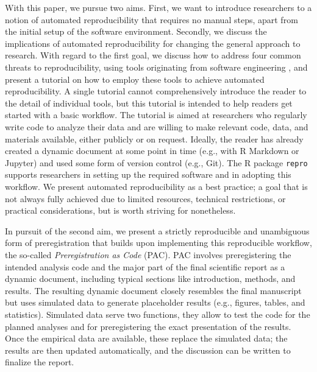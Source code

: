 \documentclass[psych,tutorial,submit,moreauthors,pdftex]{mdpi}
\begin{document}
With this paper, we pursue two aims. First, we want to introduce
researchers to a notion of automated reproducibility that requires no
manual steps, apart from the initial setup of the software environment.
Secondly, we discuss the implications of automated reproducibility for
changing the general approach to research. With regard to the first
goal, we discuss how to address four common threats to reproducibility,
using tools originating from software engineering \citep[see][ for
details]{Peikert2019}, and present a tutorial on how to employ these
tools to achieve automated reproducibility. A single tutorial cannot
comprehensively introduce the reader to the detail of individual tools,
but this tutorial is intended to help readers get started with a basic
workflow. The tutorial is aimed at researchers who regularly write code
to analyze their data and are willing to make relevant code, data, and
materials available, either publicly or on request. Ideally, the reader
has already created a dynamic document at some point in time (e.g., with
R Markdown or Jupyter) and used some form of version control (e.g.,
Git). The R package \texttt{repro} supports researchers in setting up
the required software and in adopting this workflow. We present
automated reproducibility as a best practice; a goal that is not always
fully achieved due to limited resources, technical restrictions, or
practical considerations, but is worth striving for nonetheless.

In pursuit of the second aim, we present a strictly reproducible and
unambiguous form of preregistration \citep{NosekRevolution2018} that
builds upon implementing this reproducible workflow, the so-called
\emph{Preregistration as Code} (PAC). PAC involves preregistering the
intended analysis code and the major part of the final scientific report
as a dynamic document, including typical sections like introduction,
methods, and results. The resulting dynamic document closely resembles
the final manuscript but uses simulated data to generate placeholder
results (e.g., figures, tables, and statistics). Simulated data serve
two functions, they allow to test the code for the planned analyses and
for preregistering the exact presentation of the results. Once the
empirical data are available, these replace the simulated data; the
results are then updated automatically, and the discussion can be
written to finalize the report.
\end{document}
